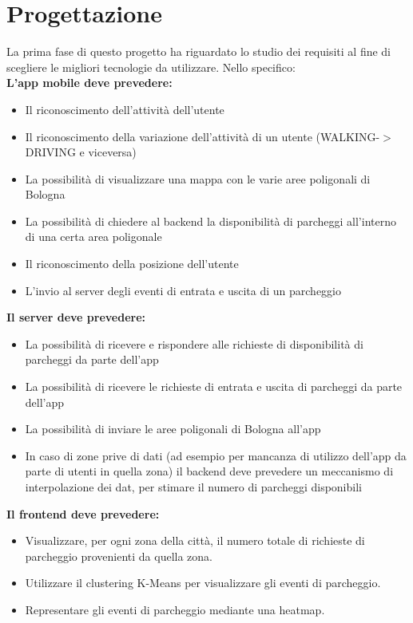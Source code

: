 \documentclass[../../Report.tex]{subfiles}
\begin{document}
    \chapter{Progettazione}
    La prima fase di questo progetto ha riguardato lo studio dei requisiti al fine di scegliere le migliori tecnologie da utilizzare. Nello specifico:\\
    \textbf{L'app mobile deve prevedere:}
        \begin{itemize}
            \item Il riconoscimento dell'attività dell'utente
            \item Il riconoscimento della variazione dell'attività di un utente (WALKING-$>$ DRIVING e viceversa)
            \item La possibilità di visualizzare una mappa con le varie aree poligonali di Bologna
            \item La possibilità di chiedere al backend la disponibilità di parcheggi all'interno di una certa area poligonale
            \item Il riconoscimento della posizione dell'utente
            \item L'invio al server degli eventi di entrata e uscita di un parcheggio
        \end{itemize}
    \textbf{Il server deve prevedere:}
        \begin{itemize}
            \item La possibilità di ricevere e rispondere alle richieste di disponibilità di parcheggi da parte dell'app
            \item La possibilità di ricevere le richieste di entrata e uscita di parcheggi da parte dell'app
            \item La possibilità di inviare le aree poligonali di Bologna all'app
            \item In caso di zone prive di dati (ad esempio per mancanza di utilizzo dell'app da parte di utenti in quella zona) il backend deve prevedere un meccanismo di interpolazione dei dat, per stimare il numero di parcheggi disponibili
        \end{itemize}
    \textbf{Il frontend deve prevedere:}
        \begin{itemize}
            \item Visualizzare, per ogni zona della città, il numero totale di richieste di parcheggio provenienti da quella zona.
            \item  Utilizzare il clustering K-Means per visualizzare gli eventi di parcheggio.
            \item Representare gli eventi di parcheggio mediante una heatmap.
        \end{itemize}
\end{document}
